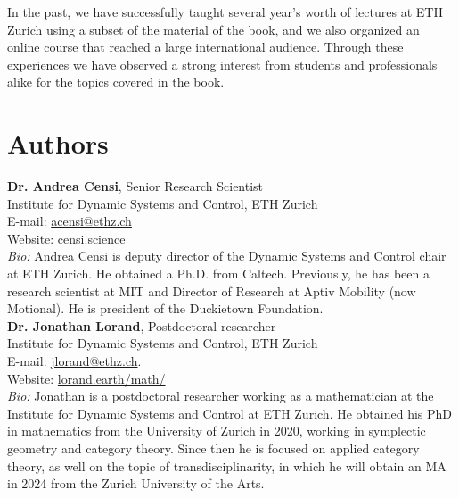\documentclass[10pt, article, one side]{memoir}
\begin{document}
    In the past, we have successfully taught several year's worth of lectures at ETH Zurich using a subset of the material of the book, and we also organized an online course that reached a large international audience. Through these experiences we have observed a strong interest from students and professionals alike for the topics covered in the book.


%
%

    \section{Authors}
    \noindent \textbf{Dr.
        Andrea Censi}, Senior Research Scientist\\
    Institute for Dynamic Systems and Control, ETH Zurich\\
    E-mail: \href{mailto:acensi@ethz.ch}{acensi@ethz.ch}\\
    Website: \href{https://censi.science}{censi.science}\\
    \emph{Bio:} Andrea Censi is deputy director of the Dynamic Systems and Control chair at ETH Zurich.
    He obtained a Ph.D.
    from Caltech.
    Previously, he has been a research scientist at MIT and Director of Research at Aptiv Mobility (now Motional).
    He is president of the Duckietown Foundation.
    \\

    \noindent \textbf{Dr.
        Jonathan Lorand}, Postdoctoral researcher\\
    Institute for Dynamic Systems and Control, ETH Zurich\\
    E-mail: \href{mailto:jlorand@ethz.ch}{jlorand@ethz.ch}.
    \\
    Website: \href{http://lorand.earth/math/}{lorand.earth/math/}\\
    \emph{Bio:}
    Jonathan is a postdoctoral researcher working as a mathematician at the Institute for Dynamic Systems and Control at ETH Zurich.
    He obtained his PhD in mathematics from the University of Zurich in 2020, working in symplectic geometry and category theory.
    Since then he is focused on applied category theory, as well on the topic of transdisciplinarity, in which he will obtain an MA in 2024 from the Zurich University of the Arts.
    \\
\end{document}
